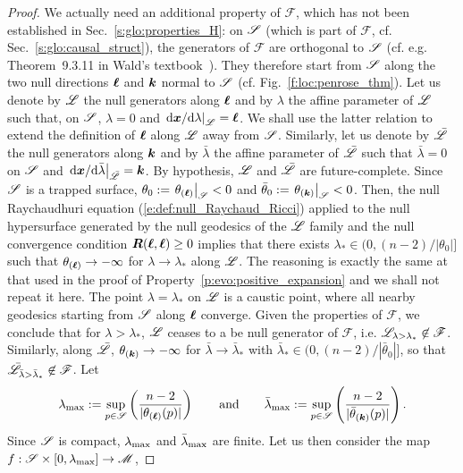 \begin{proof}
We actually need an additional property of $\mathscr{F}$,
which has not been established in Sec.~\ref{s:glo:properties_H}:
on  $\mathscr{S}$ (which is part of $\mathscr{F}$, cf. Sec.~\ref{s:glo:causal_struct}),
the generators of $\mathscr{F}$ are orthogonal to $\mathscr{S}$ (cf. e.g. Theorem~9.3.11
in Wald's textbook~\cite{Wald84}). They therefore start from $\mathscr{S}$ along
the two null directions $\bm{\ell}$ and $\bm{k}$ normal to $\mathscr{S}$ (cf. Fig.~\ref{f:loc:penrose_thm}). Let us denote by $\mathscr{L}$ the null
generators along $\bm{\ell}$ and by $\lambda$ the affine parameter of $\mathscr{L}$
such that, on $\mathscr{S}$, $\lambda = 0$ and $\left. \mathrm{d}\bm{x}/\mathrm{d}\lambda\right| _{\mathscr{L}} = \bm{\ell}$. We shall use
the latter relation to extend the definition of $\bm{\ell}$ along $\mathscr{L}$
away from $\mathscr{S}$. Similarly, let us denote by $\bar{\mathscr{L}}$ the null
generators along $\bm{k}$ and by $\bar\lambda$ the affine parameter of $\bar{\mathscr{L}}$
such that $\bar\lambda = 0$ on $\mathscr{S}$ and
$\left. \mathrm{d}\bm{x}/\mathrm{d}\bar\lambda \right| _{\bar{\mathscr{L}}}= \bm{k}$.
By hypothesis, $\mathscr{L}$ and $\bar{\mathscr{L}}$ are future-complete.
Since $\mathscr{S}$ is a trapped surface, $\theta_0 := \left. \theta_{(\bm{\ell})} \right| _{\mathscr{S}} < 0$
and $\bar\theta_0 := \left. \theta_{(\bm{k})} \right|_{\mathscr{S}}<0$.
Then, the
null Raychaudhuri equation
(\ref{e:def:null_Raychaud_Ricci}) applied to the null hypersurface
generated by the null geodesics of the $\mathscr{L}$ family and
the null convergence condition $\bm{R}(\bm{\ell},\bm{\ell}) \geq 0$ implies that there exists $\lambda_* \in (0, (n-2)/|\theta_0|]$
such that $\theta_{(\bm{\ell})} \to -\infty$ for $\lambda\to \lambda_*$ along $\mathscr{L}$.
The reasoning is exactly the same at that used in the proof of
Property~\ref{p:evo:positive_expansion} and we shall
not repeat it here. The point $\lambda=\lambda_*$ on $\mathscr{L}$ is a caustic point,
where all nearby geodesics starting from $\mathscr{S}$ along $\bm{\ell}$ converge.
Given the properties of $\mathscr{F}$, we conclude that for $\lambda > \lambda_*$, $\mathscr{L}$
ceases to a be null generator of $\mathscr{F}$, i.e.
$\mathscr{L}_{\lambda > \lambda_*} \not\in \mathscr{F}$.
Similarly, along $\bar{\mathscr{L}}$,
$\theta_{(\bm{k})} \to -\infty$ for $\bar\lambda\to \bar\lambda_*$
with $\bar\lambda_* \in (0, (n-2)/|\bar\theta_0|]$, so that
$\bar{\mathscr{L}}_{\bar\lambda > \bar\lambda_*} \not\in \mathscr{F}$.
Let
\[
    \lambda_{\rm max} := \sup_{p\in\mathscr{S}} \left(  \frac{n-2}{|\theta_{(\bm{\ell})} (p)|} \right)
    \qquad\mbox{and}\qquad
    \bar\lambda_{\rm max} := \sup_{p\in\mathscr{S}} \left(  \frac{n-2}{|\bar\theta_{(\bm{k})}(p)|} \right)    .
\]
Since $\mathscr{S}$ is compact, $\lambda_{\rm max}$ and $\bar\lambda_{\rm max}$ are finite.
Let us then consider the map $f: \mathscr{S} \times [0,\lambda_{\rm max}] \to \mathscr{M}$,

\end{proof}

